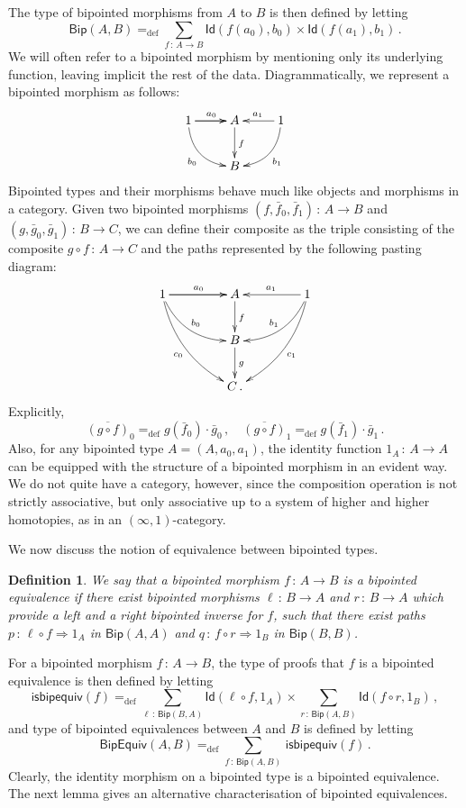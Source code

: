 \documentclass[10pt,a4paper,oneside,reqno]{amsart}
\theoremstyle{mythm}
\theoremstyle{mydef}
\newtheorem{definition}[theorem]{Definition}
\theoremstyle{myrmk}
\newcommand{\ie}{\text{i.e.\ }}
\newcommand{\myemph}[1]{\textit{#1}}
\newcommand{\defeq}{=_{\mathrm{def}}}
\newcommand{\co}{\,{:}\,}
\newcommand{\Id}{\mathsf{Id}}
\newcommand{\Bip}{\mathsf{Bip}}
\newcommand{\BipHom}{\mathsf{Bip}}
\newcommand{\isbipequiv}{\mathsf{isbipequiv}}
\newcommand{\BipEquiv}{\mathsf{BipEquiv}}
\begin{document}
The type of bipointed morphisms from $A$ to $B$ is then defined by letting
\[
\BipHom(A,B) \defeq \sum_{ f \co A \to B} \Id(  f(a_0), b_0 )  \times \Id(  f(a_1), b_1 ) \, .
\]
We will often refer to a bipointed morphism by mentioning only its underlying function, leaving implicit
the rest of the data. Diagrammatically, we represent a bipointed morphism as follows:
\[
\xymatrix{
1 \ar[r]   \ar[r]^{a_0} \ar@/_1pc/[dr]_{b_0}  & A  \ar[d]^{f} & 1  \ar[l]_{a_1} \ar@/^1pc/[dl]^{b_1} \\
  & B  &  }
 \]
Bipointed types and their morphisms behave much like objects and morphisms in a category.
Given two bipointed morphisms  $(f, \bar{f}_0, \bar{f}_1) \co A \to B$ and $(g, \bar{g}_0, \bar{g}_1) \co B \to C$, we can define their composite 
 as the triple consisting of the composite $g \circ f \co A \to C$ and the paths represented
by the following pasting diagram:
\[
\xymatrix@C=1.5cm{
1 \ar[r]   \ar[r]^{a_0}   \ar@/_1pc/[dr]^{b_0} \ar@/_1pc/[ddr]_{c_0}  & A  \ar[d]^{f} & 1 \ar[l]_{a_1}  \ar@/^1pc/[dl]_{b_1}  \ar@/^1pc/[ddl]^{c_1} \\
  & B \ar[d]^g &   \\
  & C \, . &   }
  \]
Explicitly,
\[
\overline{(g \circ f)}_0 \defeq g(\bar{f}_0) \cdot  \bar{g}_0 \, ,   \quad 
\overline{(g \circ f) }_1 \defeq  g(\bar{f}_1) \cdot   \bar{g}_1 \, .
\]
Also, for any bipointed type $A = (A, a_0, a_1)$, the identity function $1_A \co A \to A$ can be equipped with the structure of a 
bipointed morphism in an evident way. 
We do not quite have a category, however, since the composition operation is not strictly associative, but only associative up to a system of higher and higher 
homotopies, as in an $(\infty,1)$-category.  

\medskip

We now discuss the notion of equivalence between bipointed types.



\begin{definition} We say that a bipointed morphism $f \co A \to B$ is a \myemph{bipointed equivalence}
if there exist bipointed morphisms $\ell \co B \to A$ and $r \co B \to A$ which provide a left and a right bipointed inverse for $f$, \ie such that there exist paths $p \co \ell \circ f \Rightarrow 1_A$ in $\Bip(A,A)$ and $q \co f \circ r \Rightarrow 1_B$
in $\Bip(B,B)$.
\end{definition}

For a bipointed morphism $f \co A \to B$, the type of proofs that $f$ is a bipointed equivalence is
then defined by letting
\[
\isbipequiv(f) \defeq   \sum_{\ell \co \BipHom(B,A)} \Id( \ell \circ f, 1_A ) \times 
    \sum_{r \co \BipHom(A, B)} \Id (f \circ r , 1_B ) \, ,
\]
and type of bipointed equivalences between $A$ and $B$ is defined by letting
\[
\BipEquiv(A, B)
\defeq    
\sum_{f \co \BipHom(A,B)} \, \isbipequiv(f)  \, . 
\] 
Clearly, the identity morphism on a bipointed type is a bipointed equivalence. The next lemma
gives an alternative characterisation of bipointed equivalences.
\end{document}

